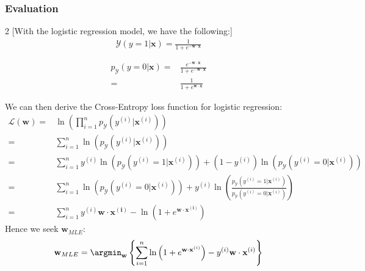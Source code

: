 \subsubsection{Evaluation}
\begin{multicols}{2}
  [With the logistic regression model, we have the following:]
   \begin{align*}
    \mathcal{Y}\left( y=1|\mathbf{x} \right)=\frac{1}{1+e^{-\mathbf{w\cdot x}}}\\\\
   \end{align*}
   \begin{align*}
     p_\mathcal{Y}\left( y=0|\mathbf{x} \right)=&\frac{e^{-\mathbf{w\cdot x}}}{1+e^{-\mathbf{w\cdot x}}}\\
     =&\frac{1}{1+e^{\mathbf{w\cdot x}}}
   \end{align*}
\end{multicols}
We can then derive the Cross-Entropy loss function for logistic regression:
\begin{align*}
\mathcal{L}(\mathbf{w})=&\ln\left( \prod_{i=1}^{n} p_\mathcal{Y}\left( y^{(i)}|\mathbf{x}^{(i)} \right)   \right) \\
=&\sum_{i=1}^{n} \ln\left( p_\mathcal{Y}\left( y^{(i)}|\mathbf{x}^{(i)} \right)  \right) \\
=&\sum_{i=1}^{n} y^{(i)}\ln\left( p_\mathcal{Y}\left( y^{(i)}=1|\mathbf{x}^{(i)} \right)  \right) + \left( 1-y^{(i)}\right) \ln\left( p_\mathcal{Y}\left( y^{(i)}=0|\mathbf{x}^{(i)} \right)  \right)  \\
=&\sum_{i=1}^{n} \ln\left( p_\mathcal{Y}\left( y^{(i)}=0|\mathbf{x}^{(i)} \right)  \right) + y^{(i)} \ln\left( \frac{p_\mathcal{Y}\left( y^{(i)}=1|\mathbf{x}^{(i)} \right)}{p_\mathcal{Y}\left( y^{(i)}=0|\mathbf{x}^{(i)} \right)} \right)  \\
=&\sum_{i=1}^{n} y^{(i)}\mathbf{w\cdot x^{(i)}}-\ln\left( 1+e^{\mathbf{w\cdot x^{(i)}}} \right) 
\end{align*}
Hence we seek $\mathbf{w}_{MLE}$:
\[\mathbf{w}_{MLE}=\argmin_{\mathbf{w}}\left\{ \sum_{i=1}^{n} \ln\left( 1+e^{\mathbf{w\cdot x}^{(i)}} \right) - y^{(i)}\mathbf{w\cdot x}^{(i)}\right\}\] 
